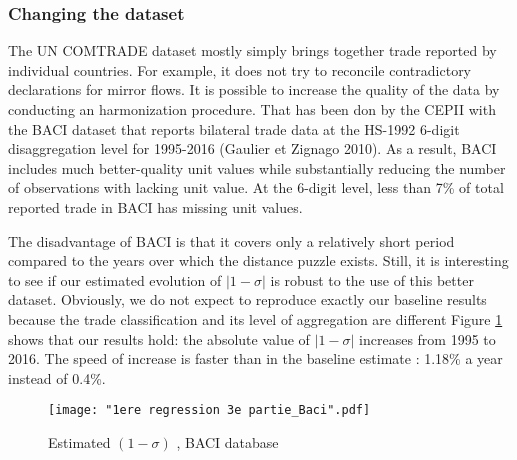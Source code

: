 \documentclass[12pt,twoside,a4paper,notitlepage]{article}
\begin{document}
\subsubsection{Changing the dataset\label{baci}}
The UN COMTRADE dataset mostly simply brings together trade reported by individual countries.
For example, it does not try to reconcile contradictory declarations for mirror flows.
It is possible to increase the quality of the data by conducting an harmonization procedure.
That has been don by the CEPII with the BACI dataset that reports bilateral trade data at the HS-1992 6-digit disaggregation level for 1995-2016 (Gaulier et Zignago 2010).
As a result, BACI includes much better-quality unit values while substantially reducing the number of observations with lacking unit value.
At the 6-digit level, less than 7\% of total reported trade in BACI has missing unit values.

The disadvantage of BACI is that it covers only a relatively short period compared to the years over which the distance puzzle exists.
Still, it is interesting to see if our estimated evolution of $|1-\sigma|$ is robust to the use of this better dataset.
Obviously, we do not expect to reproduce exactly our baseline results because the trade classification and its level of aggregation are different
Figure \ref{fig:reg_Baci} shows that our results hold: the absolute value of $|1-\sigma|$ increases from 1995 to 2016.
The speed of increase is faster than in the baseline estimate : 1.18\% a year instead of 0.4\%.

\begin{figure}[H]
\caption{Estimated $(1-\sigma)$ , BACI database}
\texttt{[image: "1ere regression 3e partie\_Baci".pdf]}
\label{fig:reg_Baci}
\end{figure}
\end{document}

